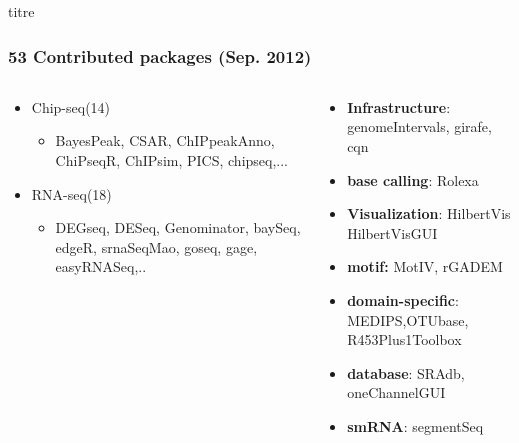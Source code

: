 \documentclass{beamer}
\begin{document}
      \begin{frame}{titre}
      \frametitle{53 Contributed packages (Sep. 2012)}
  \begin{columns}%
  
  
    \begin{column}[t]{0.45\textwidth}%
     \begin{itemize}
     \item Chip-seq(14)
      \begin{itemize}
        \item BayesPeak, CSAR, ChIPpeakAnno, ChiPseqR, ChIPsim, PICS, chipseq,...\\   
      \end{itemize}
     \item RNA-seq(18)
       \begin{itemize}
       \item DEGseq, DESeq, Genominator, baySeq, edgeR, srnaSeqMao, goseq, gage, easyRNASeq,..
      \end{itemize}
      \end{itemize}
    \end{column}
    
   
    \begin{column}[t]{0.45\textwidth}%
      \begin{itemize}
      \item \textbf{Infrastructure}: genomeIntervals, girafe, cqn
        \item \textbf{base calling}: Rolexa
        \item \textbf{Visualization}: HilbertVis HilbertVisGUI
        \item \textbf{motif:} MotIV, rGADEM
        \item \textbf{domain-specific}: MEDIPS,OTUbase, R453Plus1Toolbox
        \item \textbf{database}: SRAdb, oneChannelGUI
        \item \textbf{smRNA}: segmentSeq
      \end{itemize}
    \end{column}
  \end{columns}
\end{frame}
\end{document}
